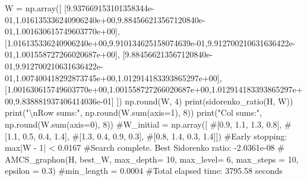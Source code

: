 \documentclass[
  letterpaper,
  DIV=11,
  numbers=noendperiod]{scrartcl}
\newenvironment{Shaded}{\begin{snugshade}}{\end{snugshade}}
\newcommand{\BuiltInTok}[1]{\textcolor[rgb]{0.00,0.23,0.31}{#1}}
\newcommand{\CharTok}[1]{\textcolor[rgb]{0.13,0.47,0.30}{#1}}
\newcommand{\CommentTok}[1]{\textcolor[rgb]{0.37,0.37,0.37}{#1}}
\newcommand{\DecValTok}[1]{\textcolor[rgb]{0.68,0.00,0.00}{#1}}
\newcommand{\FloatTok}[1]{\textcolor[rgb]{0.68,0.00,0.00}{#1}}
\newcommand{\NormalTok}[1]{\textcolor[rgb]{0.00,0.23,0.31}{#1}}
\newcommand{\OperatorTok}[1]{\textcolor[rgb]{0.37,0.37,0.37}{#1}}
\newcommand{\StringTok}[1]{\textcolor[rgb]{0.13,0.47,0.30}{#1}}
\begin{document}
\begin{Shaded}
\begin{Highlighting}[]
\NormalTok{W }\OperatorTok{=}\NormalTok{ np.array([}
\NormalTok{  [}\FloatTok{9.937669153101358344e{-}01}\NormalTok{,}\FloatTok{1.016135336240906240e+00}\NormalTok{,}\FloatTok{9.884566213567120840e{-}01}\NormalTok{,}\FloatTok{1.001630615749603770e+00}\NormalTok{],}
\NormalTok{[}\FloatTok{1.016135336240906240e+00}\NormalTok{,}\FloatTok{9.910134625158074639e{-}01}\NormalTok{,}\FloatTok{9.912700210631636422e{-}01}\NormalTok{,}\FloatTok{1.001558727266020687e+00}\NormalTok{],}
\NormalTok{[}\FloatTok{9.884566213567120840e{-}01}\NormalTok{,}\FloatTok{9.912700210631636422e{-}01}\NormalTok{,}\FloatTok{1.007400418292873745e+00}\NormalTok{,}\FloatTok{1.012914183393865297e+00}\NormalTok{],}
\NormalTok{[}\FloatTok{1.001630615749603770e+00}\NormalTok{,}\FloatTok{1.001558727266020687e+00}\NormalTok{,}\FloatTok{1.012914183393865297e+00}\NormalTok{,}\FloatTok{9.838881937406414036e{-}01}\NormalTok{]}
\NormalTok{])}
\NormalTok{np.}\BuiltInTok{round}\NormalTok{(W, }\DecValTok{4}\NormalTok{)}
\BuiltInTok{print}\NormalTok{(sidorenko\_ratio(H, W))}
\BuiltInTok{print}\NormalTok{(}\StringTok{"}\CharTok{\textbackslash{}n}\StringTok{Row sums:"}\NormalTok{, np.}\BuiltInTok{round}\NormalTok{(W.}\BuiltInTok{sum}\NormalTok{(axis}\OperatorTok{=}\DecValTok{1}\NormalTok{), }\DecValTok{8}\NormalTok{))}
\BuiltInTok{print}\NormalTok{(}\StringTok{"Col sums:"}\NormalTok{, np.}\BuiltInTok{round}\NormalTok{(W.}\BuiltInTok{sum}\NormalTok{(axis}\OperatorTok{=}\DecValTok{0}\NormalTok{), }\DecValTok{8}\NormalTok{))}
\CommentTok{\#W\_initial = np.array([}
    \CommentTok{\#[0.9, 1.1, 1.3, 0.8],}
    \CommentTok{\#[1.1, 0.5, 0.4, 1.4],}
    \CommentTok{\#[1.3, 0.4, 0.9, 0.3],}
    \CommentTok{\#[0.8, 1.4, 0.3, 1.4]])}
\CommentTok{\#Early stopping: max|W {-} 1| \textless{} 0.0167}
\CommentTok{\#Search complete. Best Sidorenko ratio: {-}2.0361e{-}08}
\CommentTok{\# AMCS\_graphon(H, best\_W, max\_depth= 10, max\_level= 6, max\_steps = 10, epsilon = 0.3)}
\CommentTok{\#min\_length = 0.0004}
\CommentTok{\#Total elapsed time: 3795.58 seconds}


\end{Highlighting}
\end{Shaded}
\end{document}
